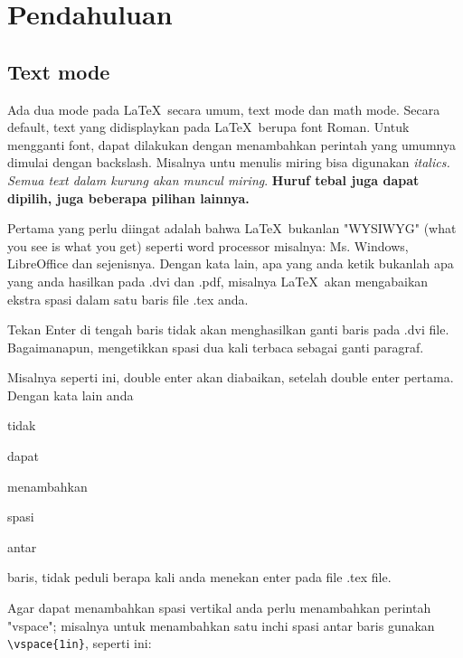 \documentclass[12pt]{article}
\begin{document}
\section{Pendahuluan}
\label{first}

\subsection{Text mode}


Ada dua mode pada \LaTeX\ secara umum, text mode dan math mode. Secara default, text yang didisplaykan pada \LaTeX\ berupa font Roman. Untuk mengganti font, dapat dilakukan dengan menambahkan perintah yang umumnya dimulai dengan backslash. Misalnya untu menulis miring bisa digunakan \textit{italics. Semua text dalam kurung akan muncul miring}. \textbf{Huruf tebal juga dapat dipilih, juga beberapa pilihan lainnya.}

Pertama yang perlu diingat adalah bahwa \LaTeX\ bukanlan "WYSIWYG" (what you see is what you get) seperti word processor misalnya: Ms. Windows, LibreOffice dan sejenisnya. Dengan kata lain, apa yang anda ketik bukanlah apa yang anda hasilkan pada .dvi dan .pdf, misalnya \LaTeX\ akan mengabaikan ekstra spasi dalam                   satu baris file .tex anda.

Tekan Enter
di
tengah
baris
tidak akan menghasilkan ganti baris pada .dvi file. Bagaimanapun, mengetikkan spasi dua kali terbaca sebagai ganti paragraf.

Misalnya seperti ini, double enter akan diabaikan, setelah double enter pertama. Dengan kata lain anda


tidak




dapat




menambahkan





spasi




antar 





baris, tidak peduli berapa kali anda menekan enter pada file .tex file.

Agar dapat menambahkan spasi vertikal anda perlu menambahkan perintah "vspace"; misalnya untuk menambahkan satu inchi spasi antar baris gunakan \verb|\vspace{1in}|, seperti ini:
\vspace{1in}
\end{document}
